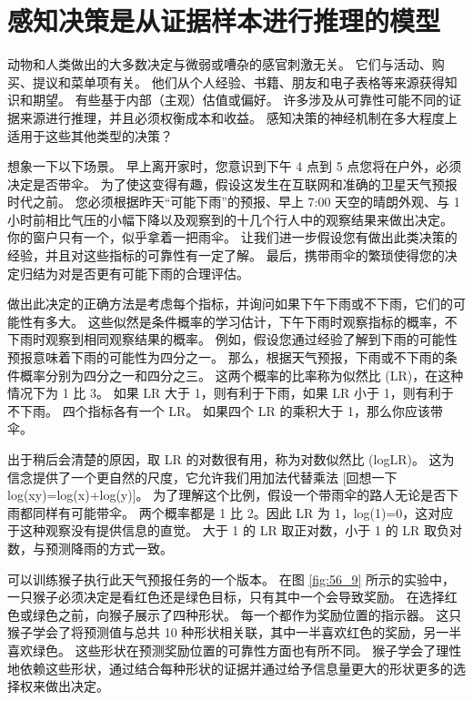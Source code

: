 \section{感知决策是从证据样本进行推理的模型}

动物和人类做出的大多数决定与微弱或嘈杂的感官刺激无关。 它们与活动、购买、提议和菜单项有关。 他们从个人经验、书籍、朋友和电子表格等来源获得知识和期望。 有些基于内部（主观）估值或偏好。 许多涉及从可靠性可能不同的证据来源进行推理，并且必须权衡成本和收益。 感知决策的神经机制在多大程度上适用于这些其他类型的决策？

想象一下以下场景。 早上离开家时，您意识到下午 4 点到 5 点您将在户外，必须决定是否带伞。 为了使这变得有趣，假设这发生在互联网和准确的卫星天气预报时代之前。 您必须根据昨天“可能下雨”的预报、早上 7:00 天空的晴朗外观、与 1 小时前相比气压的小幅下降以及观察到的十几个行人中的观察结果来做出决定。 你的窗户只有一个，似乎拿着一把雨伞。 让我们进一步假设您有做出此类决策的经验，并且对这些指标的可靠性有一定了解。 最后，携带雨伞的繁琐使得您的决定归结为对是否更有可能下雨的合理评估。

做出此决定的正确方法是考虑每个指标，并询问如果下午下雨或不下雨，它们的可能性有多大。 这些似然是条件概率的学习估计，下午下雨时观察指标的概率，不下雨时观察到相同观察结果的概率。 例如，假设您通过经验了解到下雨的可能性预报意味着下雨的可能性为四分之一。 那么，根据天气预报，下雨或不下雨的条件概率分别为四分之一和四分之三。 这两个概率的比率称为似然比 (LR)，在这种情况下为 1 比 3。 如果 LR 大于 1，则有利于下雨，如果 LR 小于 1，则有利于不下雨。 四个指标各有一个 LR。 如果四个 LR 的乘积大于 1，那么你应该带伞。

出于稍后会清楚的原因，取 LR 的对数很有用，称为对数似然比 (logLR)。 这为信念提供了一个更自然的尺度，它允许我们用加法代替乘法 [回想一下 log(xy)=log(x)+log(y)]。 为了理解这个比例，假设一个带雨伞的路人无论是否下雨都同样有可能带伞。 两个概率都是 1 比 2。因此 LR 为 1，log(1)=0，这对应于这种观察没有提供信息的直觉。 大于 1 的 LR 取正对数，小于 1 的 LR 取负对数，与预测降雨的方式一致。

可以训练猴子执行此天气预报任务的一个版本。 在图 \ref{fig:56_9} 所示的实验中，一只猴子必须决定是看红色还是绿色目标，只有其中一个会导致奖励。 在选择红色或绿色之前，向猴子展示了四种形状。 每一个都作为奖励位置的指示器。 这只猴子学会了将预测值与总共 10 种形状相关联，其中一半喜欢红色的奖励，另一半喜欢绿色。 这些形状在预测奖励位置的可靠性方面也有所不同。 猴子学会了理性地依赖这些形状，通过结合每种形状的证据并通过给予信息量更大的形状更多的选择权来做出决定。


